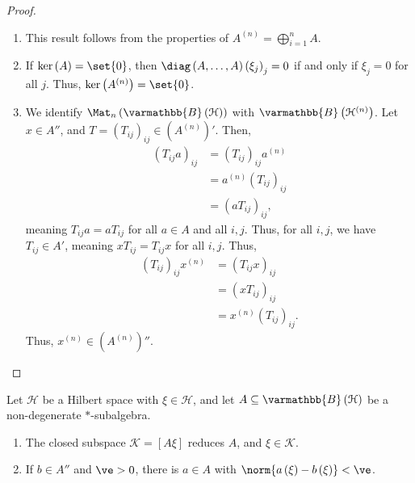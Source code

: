 \documentclass[10pt]{mypackage}
\renewcommand*{\mathbb}[1]{\varmathbb{#1}}
\newcommand{\B}{\mathbb{B}}
\begin{document}
\begin{proof}\hfill
  \begin{enumerate}[(1)]
    \item This result follows from the properties of $A^{(n)} = \bigoplus_{i=1}^{n}A$.
    \item If $\ker\left(A\right) = \set{0}$, then $ \diag\left(A,\dots,A\right)\left(\xi_j\right)_j = 0$ if and only if $\xi_j = 0$ for all $j$. Thus, $\ker\left(A^{(n)}\right) = \set{0}$.
    \item We identify $\Mat_{n}\left(\B\left(\mathcal{H}\right)\right)$ with $\B\left(\mathcal{H}^{(n)}\right)$. Let $x\in A''$, and $T = \left(T_{ij}\right)_{ij}\in \left(A^{(n)}\right)'$. Then,
      \begin{align*}
        \left(T_{ij}a\right)_{ij} &= \left(T_{ij}\right)_{ij}a^{(n)}\\
                                               &= a^{(n)}\left(T_{ij}\right)_{ij}\\
                                               &= \left(aT_{ij}\right)_{ij},
      \end{align*}
      meaning $T_{ij}a = aT_{ij}$ for all $a\in A$ and all $i,j$. Thus, for all $i,j$, we have $T_{ij}\in A'$, meaning $xT_{ij} = T_{ij}x$ for all $i,j$. Thus,
      \begin{align*}
        \left(T_{ij}\right)_{ij}x^{(n)} &= \left(T_{ij}x\right)_{ij}\\
                                        &= \left(xT_{ij}\right)_{ij}\\
                                        &= x^{(n)}\left(T_{ij}\right)_{ij}.
      \end{align*}
      Thus, $x^{(n)}\in \left(A^{(n)}\right)''$.
  \end{enumerate}
\end{proof}
\begin{lemma}
  Let $\mathcal{H}$ be a Hilbert space with $\xi\in \mathcal{H}$, and let $A\subseteq \B\left(\mathcal{H}\right)$ be a non-degenerate $\ast$-subalgebra.
  \begin{enumerate}[(1)]
    \item The closed subspace $\mathcal{K} = \left[A\xi\right]$ reduces $A$, and $\xi\in \mathcal{K}$.
    \item If $b\in A''$ and $\ve > 0$, there is $a\in A$ with $\norm{a\left(\xi\right) - b\left(\xi\right)} < \ve$.
  \end{enumerate}
\end{lemma}
\end{document}
